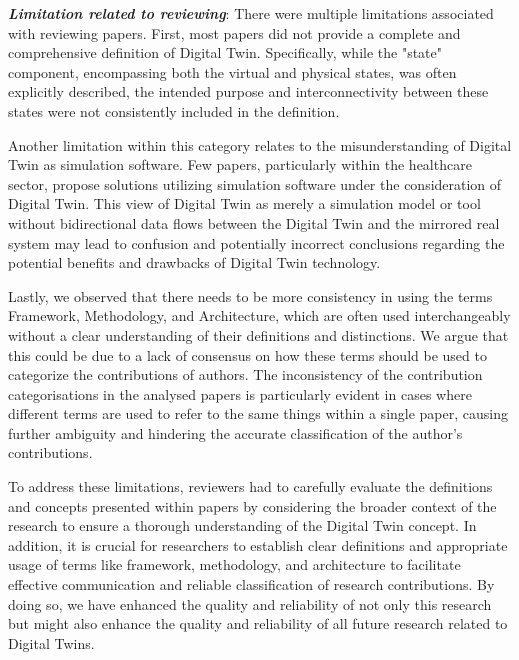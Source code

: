 
\textbf{\textit{Limitation related to reviewing}}: There were multiple limitations associated with reviewing papers. First, most papers did not provide a complete and comprehensive definition of Digital Twin. Specifically, while the "state" component, encompassing both the virtual and physical states, was often explicitly described, the intended purpose and interconnectivity between these states were not consistently included in the definition.

 Another limitation within this category relates to the misunderstanding of Digital Twin as simulation software. Few papers, particularly within the healthcare sector, propose solutions utilizing simulation software under the consideration of Digital Twin. This view of Digital Twin as merely a simulation model or tool without bidirectional data flows between the Digital Twin and the mirrored real system may lead to confusion and potentially incorrect conclusions regarding the potential benefits and drawbacks of Digital Twin technology.

 Lastly, we observed that there needs to be more consistency in using the terms Framework, Methodology, and Architecture, which are often used interchangeably without a clear understanding of their definitions and distinctions. We argue that this could be due to a lack of consensus on how these terms should be used to categorize the contributions of authors. The inconsistency of the contribution categorisations in the analysed papers is particularly evident in cases where different terms are used to refer to the same things within a single paper, causing further ambiguity and hindering the accurate classification of the author's contributions.

 To address these limitations, reviewers had to carefully evaluate the definitions and concepts presented within papers by considering the broader context of the research to ensure a thorough understanding of the Digital Twin concept. In addition, it is crucial for researchers to establish clear definitions and appropriate usage of terms like framework, methodology, and architecture to facilitate effective communication and reliable classification of research contributions. By doing so, we have enhanced the quality and reliability of not only this research but might also enhance the quality and reliability of all future research related to Digital Twins.


